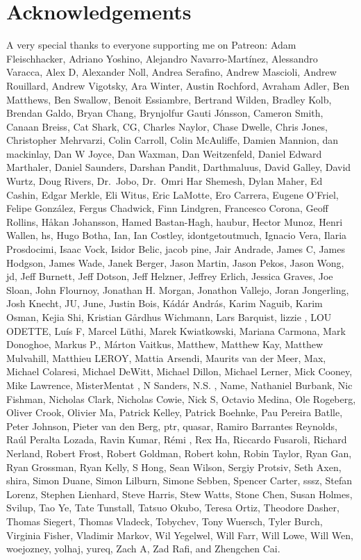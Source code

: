 \documentclass[
  letterpaper,
  DIV=11,
  numbers=noendperiod]{scrartcl}
\begin{document}
\section*{Acknowledgements}\label{acknowledgements}

A very special thanks to everyone supporting me on Patreon: Adam
Fleischhacker, Adriano Yoshino, Alejandro Navarro-Martínez, Alessandro
Varacca, Alex D, Alexander Noll, Andrea Serafino, Andrew Mascioli,
Andrew Rouillard, Andrew Vigotsky, Ara Winter, Austin Rochford, Avraham
Adler, Ben Matthews, Ben Swallow, Benoit Essiambre, Bertrand Wilden,
Bradley Kolb, Brendan Galdo, Bryan Chang, Brynjolfur Gauti Jónsson,
Cameron Smith, Canaan Breiss, Cat Shark, CG, Charles Naylor, Chase
Dwelle, Chris Jones, Christopher Mehrvarzi, Colin Carroll, Colin
McAuliffe, Damien Mannion, dan mackinlay, Dan W Joyce, Dan Waxman, Dan
Weitzenfeld, Daniel Edward Marthaler, Daniel Saunders, Darshan Pandit,
Darthmaluus, David Galley, David Wurtz, Doug Rivers, Dr.~Jobo, Dr.~Omri
Har Shemesh, Dylan Maher, Ed Cashin, Edgar Merkle, Eli Witus, Eric
LaMotte, Ero Carrera, Eugene O'Friel, Felipe González, Fergus Chadwick,
Finn Lindgren, Francesco Corona, Geoff Rollins, Håkan Johansson, Hamed
Bastan-Hagh, haubur, Hector Munoz, Henri Wallen, hs, Hugo Botha, Ian,
Ian Costley, idontgetoutmuch, Ignacio Vera, Ilaria Prosdocimi, Isaac
Vock, Isidor Belic, jacob pine, Jair Andrade, James C, James Hodgson,
James Wade, Janek Berger, Jason Martin, Jason Pekos, Jason Wong, jd,
Jeff Burnett, Jeff Dotson, Jeff Helzner, Jeffrey Erlich, Jessica Graves,
Joe Sloan, John Flournoy, Jonathan H. Morgan, Jonathon Vallejo, Joran
Jongerling, Josh Knecht, JU, June, Justin Bois, Kádár András, Karim
Naguib, Karim Osman, Kejia Shi, Kristian Gårdhus Wichmann, Lars
Barquist, lizzie , LOU ODETTE, Luís F, Marcel Lüthi, Marek Kwiatkowski,
Mariana Carmona, Mark Donoghoe, Markus P., Márton Vaitkus, Matthew,
Matthew Kay, Matthew Mulvahill, Matthieu LEROY, Mattia Arsendi, Maurits
van der Meer, Max, Michael Colaresi, Michael DeWitt, Michael Dillon,
Michael Lerner, Mick Cooney, Mike Lawrence, MisterMentat , N Sanders,
N.S. , Name, Nathaniel Burbank, Nic Fishman, Nicholas Clark, Nicholas
Cowie, Nick S, Octavio Medina, Ole Rogeberg, Oliver Crook, Olivier Ma,
Patrick Kelley, Patrick Boehnke, Pau Pereira Batlle, Peter Johnson,
Pieter van den Berg, ptr, quasar, Ramiro Barrantes Reynolds, Raúl
Peralta Lozada, Ravin Kumar, Rémi , Rex Ha, Riccardo Fusaroli, Richard
Nerland, Robert Frost, Robert Goldman, Robert kohn, Robin Taylor, Ryan
Gan, Ryan Grossman, Ryan Kelly, S Hong, Sean Wilson, Sergiy Protsiv,
Seth Axen, shira, Simon Duane, Simon Lilburn, Simone Sebben, Spencer
Carter, sssz, Stefan Lorenz, Stephen Lienhard, Steve Harris, Stew Watts,
Stone Chen, Susan Holmes, Svilup, Tao Ye, Tate Tunstall, Tatsuo Okubo,
Teresa Ortiz, Theodore Dasher, Thomas Siegert, Thomas Vladeck, Tobychev,
Tony Wuersch, Tyler Burch, Virginia Fisher, Vladimir Markov, Wil
Yegelwel, Will Farr, Will Lowe, Will Wen, woejozney, yolhaj, yureq, Zach
A, Zad Rafi, and Zhengchen Cai.
\end{document}
